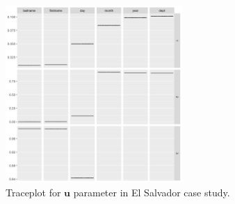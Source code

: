 \documentclass[ba]{imsart}
\begin{document}
	\begin{figure}[!h]
		\begin{center}
			\includegraphics[width=0.6\textwidth]{../notes/figures/el_salvador/u_trace} 
			\caption{Traceplot for $\bm{u}$ parameter in El Salvador case study.} \label{fig:u_trace}
		\end{center}
	\end{figure}
\end{document}
